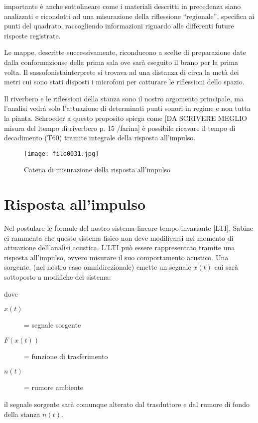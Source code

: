 importante è anche sottolineare come i materiali descritti in precedenza siano analizzati e ricondotti ad
una misurazione della riflessione “regionale”, specifica ai punti del quadrato, raccogliendo informazioni
riguardo alle differenti future risposte registrate.

Le mappe, descritte successivamente, riconducono a scelte di preparazione date dalla conformazionse della
prima sala ove sarà eseguito il brano per la prima volta. Il sassofonistainterprete si trovava ad una
distanza di circa la metà dei metri cui sono stati disposti i microfoni per catturare le  riflessioni dello spazio.	

Il riverbero e le riflessioni della stanza sono il nostro argomento principale, ma l'analisi vedrà solo
l'attuazione di determinati punti sonori in regime e non tutta la pianta.
Schroeder a questo proposito spiega come [DA SCRIVERE MEGLIO misura del ltempo di riverbero p. 15 /farina]
è possibile ricavare il tempo di decadimento (T60) tramite integrale della risposta all'impulso.

\begin{figure}
\centering
{\texttt{[image: file0031.jpg]}}
\caption[Pianta S. Luca]{Catena di misurazione della risposta all'impulso}
\label{fig:tetratetra}
\end{figure}

\section{Risposta all'impulso}

Nel postulare le formule del nostro sistema lineare tempo invariante [LTI], Sabine ci rammenta
che questo sistema fisico  non deve  modificarsi nel momento di attuazione dell'analisi acustica.
L'LTI può essere rappresentato tramite una risposta all'impulso, ovvero misurare il suo
comportamento acustico.  Una sorgente, (nel nostro caso omnidirezionale) emette un
segnale $x(t)$  cui sarà sottoposto a modifiche del sistema:

dove

\begin{description}
	\item[$x(t)$] = segnale sorgente 
	\item[$F(x(t))$] = funzione di trasferimento
	\item[$n(t)$] = rumore ambiente
\end{description}

il segnale sorgente sarà comunque alterato dal trasduttore e dal rumore di fondo della stanza $n(t)$.

